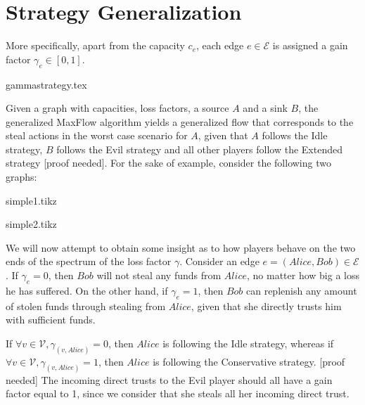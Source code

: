 \section{Strategy Generalization}
  More specifically, apart from the capacity $c_e$, each edge $e \in \mathcal{E}$ is assigned a gain factor $\gamma_e \in
  \left[0, 1\right]$. 
  
  {gammastrategy.tex}

  Given a graph with capacities, loss factors, a source $A$ and a sink $B$, the generalized MaxFlow algorithm yields a
  generalized flow that corresponds to the steal actions in the worst case scenario for $A$, given that $A$ follows the Idle
  strategy, $B$ follows the Evil strategy and all other players follow the Extended strategy [proof needed]. For the sake of
  example, consider the following two graphs:
  
  {simple1.tikz}

  {simple2.tikz}

  We will now attempt to obtain some insight as to how players behave on the two ends of the spectrum of the loss factor
  $\gamma$. Consider an edge $e = \left(Alice, Bob\right) \in \mathcal{E}$. If $\gamma_e = 0$, then $Bob$ will not steal any
  funds from $Alice$, no matter how big a loss he has suffered. On the other hand, if $\gamma_e = 1$, then $Bob$ can replenish
  any amount of stolen funds through stealing from $Alice$, given that she directly trusts him with sufficient funds.
  
  If $\forall v \in \mathcal{V}, \gamma_{\left(v, Alice\right)} = 0$, then $Alice$ is following the Idle strategy, whereas if
  $\forall v \in \mathcal{V}, \gamma_{\left(v, Alice\right)} = 1$, then $Alice$ is following the Conservative strategy. [proof
  needed] The incoming direct trusts to the Evil player should all have a gain factor equal to 1, since we consider that she
  steals all her incoming direct trust.
